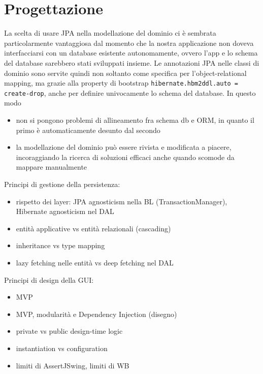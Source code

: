 \section{Progettazione}
La scelta di usare JPA nella modellazione del dominio ci è sembrata particolarmente vantaggiosa
dal momento che la nostra applicazione non doveva interfacciarsi con un database esistente autonomamente,
ovvero l'app e lo schema del database sarebbero stati sviluppati insieme. 
Le annotazioni JPA nelle classi di dominio
sono servite quindi non soltanto come specifica per l'object-relational mapping, ma grazie alla property
di bootstrap \texttt{hibernate.hbm2ddl.auto = create-drop}, anche per definire univocamente lo schema del database.
In questo modo 
\begin{itemize}
    \item non si pongono problemi di allineamento fra schema db e ORM, in quanto il primo
        è automaticamente desunto dal secondo
    \item la modellazione del dominio può essere rivista e modificata a piacere, incoraggiando
        la ricerca di soluzioni efficaci anche quando scomode da mappare manualmente
\end{itemize}

Principi di gestione della persistenza:
\begin{itemize}
    \item rispetto dei layer: JPA agnosticism nella BL (TransactionManager), Hibernate agnosticism nel DAL
    \item entità applicative vs entità relazionali (cascading)
    \item inheritance vs type mapping
    \item lazy fetching nelle entità vs deep fetching nel DAL
\end{itemize}

Principi di design della GUI:
\begin{itemize}
    \item MVP
    \item MVP, modularità e Dependency Injection (disegno)
    \item private vs public design-time logic
    \item instantiation vs configuration
    \item limiti di AssertJSwing, limiti di WB
\end{itemize}


